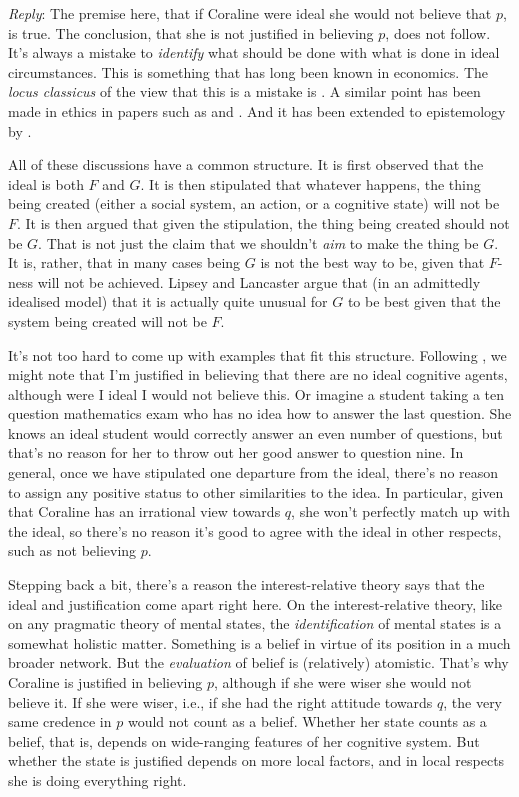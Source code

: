 \textit{Reply}:
The premise here, that if Coraline were ideal she would not believe that $p$, is true. The conclusion, that she is not justified in believing $p$, does not follow. It's always a mistake to \textit{identify} what should be done with what is done in ideal circumstances. This is something that has long been known in economics. The \textit{locus classicus} of the view that this is a mistake is \citet{LipseyLancaster}. A similar point has been made in ethics in papers such as \citet{Watson1977} and \citet{KennettSmith1996b, KennettSmith1996a}. And it has been extended to epistemology by \citet{Williamson1998-WILCOK}.

All of these discussions have a common structure. It is first observed that the ideal is both $F$ and $G$. It is then stipulated that whatever happens, the thing being created (either a social system, an action, or a cognitive state) will not be $F$. It is then argued that given the stipulation, the thing being created should not be $G$. That is not just the claim that we shouldn't \textit{aim} to make the thing be $G$. It is, rather, that in many cases being $G$ is not the best way to be, given that $F$-ness will not be achieved. Lipsey and Lancaster argue that (in an admittedly idealised model) that it is actually quite unusual for $G$ to be best given that the system being created will not be $F$.

It's not too hard to come up with examples that fit this structure. Following \cite[209]{Williamson2000-WILKAI}, we might note that I'm justified in believing that there are no ideal cognitive agents, although were I ideal I would not believe this. Or imagine a student taking a ten question mathematics exam who has no idea how to answer the last question. She knows an ideal student would correctly answer an even number of questions, but that's no reason for her to throw out her good answer to question nine. In general, once we have stipulated one departure from the ideal, there's no reason to assign any positive status to other similarities to the idea. In particular, given that Coraline has an irrational view towards $q$, she won't perfectly match up with the ideal, so there's no reason it's good to agree with the ideal in other respects, such as not believing $p$.

Stepping back a bit, there's a reason the interest-relative theory says that the ideal and justification come apart right here. On the interest-relative theory, like on any pragmatic theory of mental states, the \textit{identification} of mental states is a somewhat holistic matter. Something is a belief in virtue of its position in a much broader network. But the \textit{evaluation} of belief is (relatively) atomistic. That's why Coraline is justified in believing $p$, although if she were wiser she would not believe it. If she were wiser, i.e., if she had the right attitude towards $q$, the very same credence in $p$ would not count as a belief. Whether her state counts as a belief, that is, depends on wide-ranging features of her cognitive system. But whether the state is justified depends on more local factors, and in local respects she is doing everything right.

